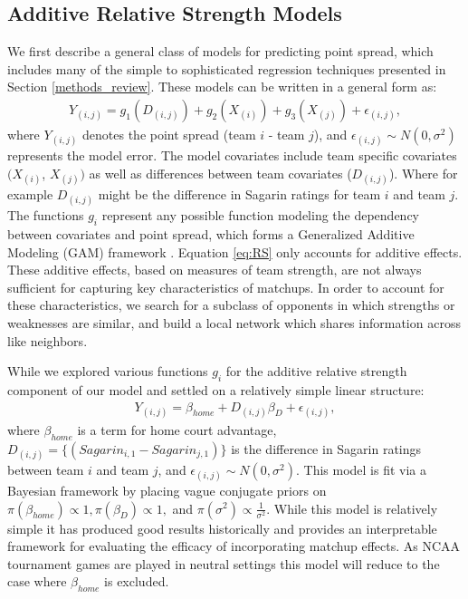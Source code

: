 \documentclass[letterpaper,12pt]{article}
\begin{document}
\subsection{Additive Relative Strength Models \label{sec:AS}}
We first describe a general class of models for predicting point spread, which includes many of the simple to sophisticated regression techniques presented in Section \ref{methods_review}. These models can be written in a general form as:
\begin{eqnarray}
Y_{(i,j)} = g_1\left(D_{(i,j)}\right) + g_2\left(X_{(i)}\right) + g_3\left(X_{(j)}\right) +  \epsilon_{(i,j)},
\label{eq:RS}
\end{eqnarray}
where $Y_{(i,j)}$ denotes the point spread (team $i$ - team $j$), and $\epsilon_{(i,j)}\sim N(0,\sigma^2)$ represents the model error. The model covariates include team specific covariates $(X_{(i)}$, $X_{(j)})$ as well as differences between team covariates ($D_{(i,j)}$). Where for example $D_{(i,j)}$ might be the difference in Sagarin ratings for team $i$ and team $j$. The functions $g_i$ represent any possible function modeling the dependency between covariates and point spread, which forms a Generalized Additive Modeling (GAM) framework \citep{GAMs}. Equation \ref{eq:RS} only accounts for additive effects. These additive effects, based on measures of team strength, are not always sufficient for capturing key characteristics of matchups. In order to account for these characteristics, we search for a subclass of opponents in which strengths or weaknesses are similar, and build a local network which shares information across like neighbors.  

While we explored various functions $g_i$ for the additive relative strength component of our model and settled on a relatively simple linear structure:
\begin{eqnarray}
Y_{(i,j)} =  \beta_{home} + D_{(i,j)}\beta_D +  \epsilon_{(i,j)},
\label{eq:RS2}
\end{eqnarray}
where $\beta_{home}$ is a term for home court advantage, $D_{(i,j)}=\{(Sagarin_{i,1} - Sagarin_{j,1})\}$ is the difference in Sagarin ratings between team $i$ and team $j$, and $\epsilon_{(i,j)} \sim N(0,\sigma^2).$ This model is fit via a Bayesian framework by placing vague conjugate priors on $\pi(\beta_{home})\propto 1, \pi(\beta_D) \propto 1,$ and $ \pi(\sigma^2) \propto \frac{1}{\sigma^2}$. While this model is relatively simple it has produced good results historically \citep{carlin1996} and provides an interpretable framework for evaluating the efficacy of incorporating matchup effects. As NCAA tournament games are played in neutral settings this model will reduce to the case where $\beta_{home}$ is excluded.
\end{document}
